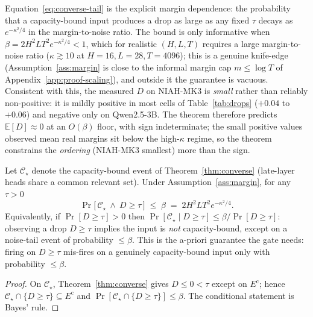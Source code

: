 Equation~\eqref{eq:converse-tail} is the explicit margin dependence: the
probability that a capacity-bound input produces a drop as large as any fixed
$\tau$ decays as $e^{-\kappa^2/4}$ in the margin-to-noise ratio. The bound is
only informative when $\beta = 2H^2 L T^2 e^{-\kappa^2/4} < 1$, which for
realistic $(H, L, T)$ requires a large margin-to-noise ratio
($\kappa \gtrsim 10$ at $H{=}16, L{=}28, T{=}4096$); this is a genuine
knife-edge (Assumption~\ref{ass:margin} is close to the informal margin cap
$m \le \log T$ of Appendix~\ref{app:proof-scaling}), and outside it the
guarantee is vacuous. Consistent with this, the measured $D$ on NIAH-MK3 is
\emph{small} rather than reliably non-positive: it is mildly positive in most
cells of Table~\ref{tab:drops} ($+0.04$ to $+0.06$) and negative only on
Qwen2.5-3B. The theorem therefore predicts $\mathbb{E}[D] \approx 0$ at an
$O(\beta)$ floor, with sign indeterminate; the small positive values observed
mean real margins sit below the high-$\kappa$ regime, so the theorem constrains
the \emph{ordering} (NIAH-MK3 smallest) more than the sign.

\begin{corollary}
\label{cor:contrapositive}
Let $\mathcal{C}_\star$ denote the capacity-bound event of
Theorem~\ref{thm:converse} (late-layer heads share a common relevant set).
Under Assumption~\ref{ass:margin}, for any $\tau>0$
\begin{equation}
\label{eq:contrapositive}
\Pr\bigl[\,\mathcal{C}_\star \ \wedge\ D\ge\tau\,\bigr]\;\le\;\beta
\;=\;2H^2 L T^2 e^{-\kappa^2/4}.
\end{equation}
Equivalently, if $\Pr[D\ge\tau]>0$ then
$\Pr[\mathcal{C}_\star \mid D\ge\tau]\le \beta/\Pr[D\ge\tau]$: observing a drop
$D\ge\tau$ implies the input is \emph{not} capacity-bound, except on a
noise-tail event of probability $\le\beta$. This is the a-priori guarantee the
gate needs: firing on $D\ge\tau$ mis-fires on a genuinely capacity-bound input
only with probability $\le\beta$.
\end{corollary}

\begin{proof}
On $\mathcal{C}_\star$, Theorem~\ref{thm:converse} gives $D\le0<\tau$ except on
$E^{\mathrm c}$; hence $\mathcal{C}_\star\cap\{D\ge\tau\}\subseteq E^{\mathrm c}$
and $\Pr[\mathcal{C}_\star\cap\{D\ge\tau\}]\le\beta$. The conditional statement
is Bayes' rule.
\end{proof}


